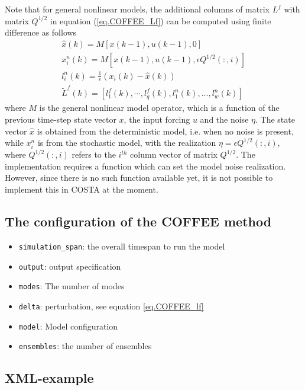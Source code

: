 Note that for general nonlinear models, the additional columns of matrix $L^f$
with matrix $Q^{1/2}$ in equation (\ref{eq.COFFEE_Lf}) can be computed using
finite difference as follows
\begin{eqnarray}
  \hat{x}(k) = M[x(k-1),u(k-1),0] \\
  x^n_i(k) = M[x(k-1),u(k-1),\epsilon Q^{1/2}(:,i)] \\
  l^n_i(k) =  \frac{1}{\epsilon} (x_i(k) - \hat{x}(k))\\
  \tilde{L}^f(k)=[l_1^f(k),\cdots,l_q^f(k),l^n_1(k),...,l^n_w(k)]
\end{eqnarray}
where $M$ is the general nonlinear model operator, which is a function of the
previous time-step state vector $x$, the input forcing $u$ and the noise
$\eta$. The state vector $\hat{x}$ is obtained from the deterministic model,
i.e. when no noise is present, while $x^n_i$ is from the stochastic model, with
the realization $\eta=\epsilon Q^{1/2}(:,i)$, where $Q^{1/2}(:,i)$ refers to
the $i^{th}$ column vector of matrix $Q^{1/2}$. The implementation requires a
function which can set the model noise realization. However, since there is no
such function available yet, it is not possible to implement this in COSTA at
the moment.

\subsection{The configuration of the COFFEE method}
\begin{itemize}

\item {\tt simulation\_span}: the overall timespan to run the model
\item {\tt output}: output specification
\item {\tt modes}: The number of modes
\item {\tt delta}: perturbation, see equation \ref{eq.COFFEE_lf}
\item {\tt model}: Model configuration
\item {\tt ensembles}: the number of ensembles
\end{itemize}

\subsection{XML-example}

